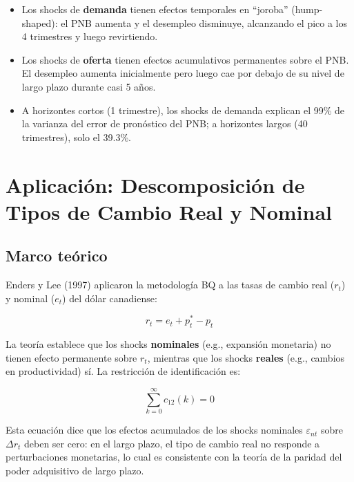 \documentclass[12pt]{article}
\begin{document}
\begin{itemize}
  \item Los shocks de \textbf{demanda} tienen efectos temporales en ``joroba'' (hump-shaped): el PNB aumenta y el desempleo disminuye, alcanzando el pico a los 4 trimestres y luego revirtiendo.
  \item Los shocks de \textbf{oferta} tienen efectos acumulativos permanentes sobre el PNB. El desempleo aumenta inicialmente pero luego cae por debajo de su nivel de largo plazo durante casi 5 a\~nos.
  \item A horizontes cortos (1 trimestre), los shocks de demanda explican el 99\% de la varianza del error de pron\'ostico del PNB; a horizontes largos (40 trimestres), solo el 39.3\%.
\end{itemize}

\section{Aplicaci\'on: Descomposici\'on de Tipos de Cambio Real y Nominal}

\subsection{Marco te\'orico}

Enders y Lee (1997) aplicaron la metodolog\'ia BQ a las tasas de cambio real ($r_t$) y nominal ($e_t$) del d\'olar canadiense:

\[
r_t = e_t + p_t^* - p_t
\]

La teor\'ia establece que los shocks \textbf{nominales} (e.g., expansi\'on monetaria) no tienen efecto permanente sobre $r_t$, mientras que los shocks \textbf{reales} (e.g., cambios en productividad) s\'i. La restricci\'on de identificaci\'on es:

\begin{equation}
\sum_{k=0}^{\infty} c_{12}(k) = 0
\end{equation}

\begin{intuicionmat}
Esta ecuaci\'on dice que los efectos acumulados de los shocks nominales $\varepsilon_{nt}$ sobre $\Delta r_t$ deben ser cero: en el largo plazo, el tipo de cambio real no responde a perturbaciones monetarias, lo cual es consistente con la teor\'ia de la paridad del poder adquisitivo de largo plazo.
\end{intuicionmat}
\end{document}
